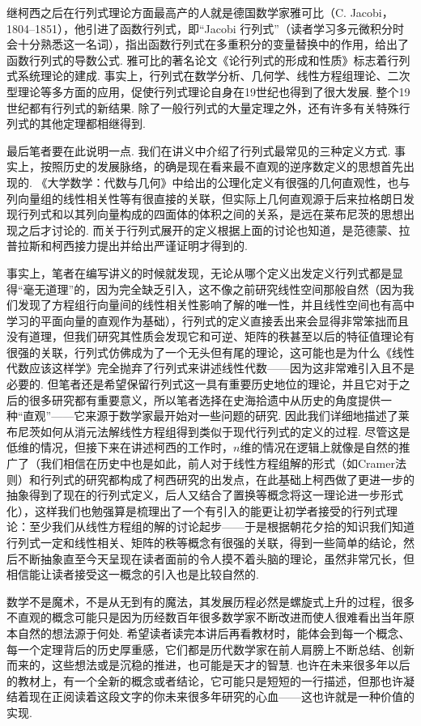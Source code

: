 继柯西之后在行列式理论方面最高产的人就是德国数学家雅可比（C. Jacobi，1804--1851），他引进了函数行列式，即``Jacobi 行列式''（读者学习多元微积分时会十分熟悉这一名词），指出函数行列式在多重积分的变量替换中的作用，给出了函数行列式的导数公式. 雅可比的著名论文《论行列式的形成和性质》标志着行列式系统理论的建成. 事实上，行列式在数学分析、几何学、线性方程组理论、二次型理论等多方面的应用，促使行列式理论自身在19世纪也得到了很大发展. 整个19世纪都有行列式的新结果. 除了一般行列式的大量定理之外，还有许多有关特殊行列式的其他定理都相继得到.

最后笔者要在此说明一点. 我们在讲义中介绍了行列式最常见的三种定义方式. 事实上，按照历史的发展脉络，的确是现在看来最不直观的逆序数定义的思想首先出现的. 《大学数学：代数与几何》中给出的公理化定义有很强的几何直观性，也与列向量组的线性相关性等有很直接的关联，但实际上几何直观源于后来拉格朗日发现行列式和以其列向量构成的四面体的体积之间的关系，是远在莱布尼茨的思想出现之后才讨论的. 而关于行列式展开的定义根据上面的讨论也知道，是范德蒙、拉普拉斯和柯西接力提出并给出严谨证明才得到的.

事实上，笔者在编写讲义的时候就发现，无论从哪个定义出发定义行列式都是显得``毫无道理''的，因为完全缺乏引入，这不像之前研究线性空间那般自然（因为我们发现了方程组行向量间的线性相关性影响了解的唯一性，并且线性空间也有高中学习的平面向量的直观作为基础），行列式的定义直接丢出来会显得非常笨拙而且没有道理，但我们研究其性质会发现它和可逆、矩阵的秩甚至以后的特征值理论有很强的关联，行列式仿佛成为了一个无头但有尾的理论，这可能也是为什么《线性代数应该这样学》完全抛弃了行列式来讲述线性代数——因为这非常难引入且不是必要的. 但笔者还是希望保留行列式这一具有重要历史地位的理论，并且它对于之后的很多研究都有重要意义，所以笔者选择在史海拾遗中从历史的角度提供一种``直观''——它来源于数学家最开始对一些问题的研究. 因此我们详细地描述了莱布尼茨如何从消元法解线性方程组得到类似于现代行列式的定义的过程. 尽管这是低维的情况，但接下来在讲述柯西的工作时，$n$维的情况在逻辑上就像是自然的推广了（我们相信在历史中也是如此，前人对于线性方程组解的形式（如Cramer法则）和行列式的研究都构成了柯西研究的出发点，在此基础上柯西做了更进一步的抽象得到了现在的行列式定义，后人又结合了置换等概念将这一理论进一步形式化），这样我们也勉强算是梳理出了一个有引入的能更让初学者接受的行列式理论：至少我们从线性方程组的解的讨论起步——于是根据朝花夕拾的知识我们知道行列式一定和线性相关、矩阵的秩等概念有很强的关联，得到一些简单的结论，然后不断抽象直至今天呈现在读者面前的令人摸不着头脑的理论，虽然非常冗长，但相信能让读者接受这一概念的引入也是比较自然的.

数学不是魔术，不是从无到有的魔法，其发展历程必然是螺旋式上升的过程，很多不直观的概念可能只是因为历经数百年很多数学家不断改进而使人很难看出当年原本自然的想法源于何处. 希望读者读完本讲后再看教材时，能体会到每一个概念、每一个定理背后的历史厚重感，它们都是历代数学家在前人肩膀上不断总结、创新而来的，这些想法或是沉稳的推进，也可能是天才的智慧. 也许在未来很多年以后的教材上，有一个全新的概念或者结论，它可能只是短短的一行描述，但那也许凝结着现在正阅读着这段文字的你未来很多年研究的心血——这也许就是一种价值的实现.

